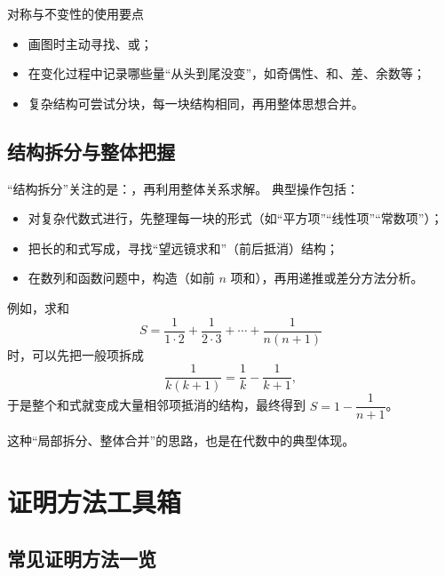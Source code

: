 \documentclass[a4paper,11pt]{ctexart}
\begin{document}
\begin{summarybox}{对称与不变性的使用要点}
\begin{itemize}
  \item 画图时主动寻找、或；
  \item 在变化过程中记录哪些量“从头到尾没变”，如奇偶性、和、差、余数等；
  \item 复杂结构可尝试分块，每一块结构相同，再用整体思想合并。
\end{itemize}
\end{summarybox}

\subsection{结构拆分与整体把握}

“结构拆分”关注的是：，再利用整体关系求解。
典型操作包括：
\begin{itemize}
  \item 对复杂代数式进行，先整理每一块的形式（如“平方项”“线性项”“常数项”）；
  \item 把长的和式写成，寻找“望远镜求和”（前后抵消）结构；
  \item 在数列和函数问题中，构造（如前 $n$ 项和），再用递推或差分方法分析。
\end{itemize}

例如，求和
\[
S=\frac{1}{1\cdot2}+\frac{1}{2\cdot3}+\cdots+\frac{1}{n(n+1)}
\]
时，可以先把一般项拆成
\[
\frac{1}{k(k+1)}=\frac{1}{k}-\frac{1}{k+1},
\]
于是整个和式就变成大量相邻项抵消的结构，最终得到 $S=1-\dfrac{1}{n+1}$。

这种“局部拆分、整体合并”的思路，也是在代数中的典型体现。

\section{证明方法工具箱}

\subsection{常见证明方法一览}
\end{document}
